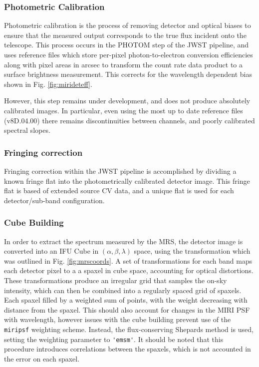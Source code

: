 \subsubsection{Photometric Calibration}
Photometric calibration is the process of removing detector and optical biases to ensure that the measured output corresponds to the true flux incident onto the telescope.
This process occurs in the PHOTOM step of the JWST pipeline, and uses reference files which store per-pixel photon-to-electron conversion efficiencies along with pixel areas in arcsec to transform the count rate data product to a surface brightness measurement.
This corrects for the wavelength dependent bias shown in Fig. \ref{fig:mirideteff}.

However, this step remains under development, and does not produce absolutely calibrated images. In particular, even using the most up to date reference files (v8D.04.00) there remains discontinuities between channels, and poorly calibrated spectral slopes.

\subsubsection{Fringing correction}
Fringing correction within the JWST pipeline is accomplished by dividing a known fringe flat into the photometrically calibrated detector image. 
This fringe flat is based of extended source CV data, and a unique flat is used for each detector/sub-band configuration.

\subsubsection{Cube Building}
In order to extract the spectrum measured by the MRS, the detector image is converted into an IFU Cube in $(\alpha,\beta,\lambda)$ space, using the transformation which was outlined in Fig. \ref{fig:mrscoords}.
A set of transformations for each band maps each detector pixel to a a spaxel in cube space, accounting for  optical distortions. 
These transformations produce an irregular grid that samples the on-sky intensity, which can then be combined into a regularly spaced grid of spaxels.
Each spaxel filled by a weighted sum of points, with the weight decreasing with distance from the spaxel. 
This should also account for changes in the MIRI PSF with wavelength, however issues with the cube building prevent use of the \verb|miripsf| weighting scheme.
Instead, the flux-conserving Shepards method is used, setting the weighting parameter to \verb|'emsm'|.
It should be noted that this procedure introduces correlations between the spaxels, which is not accounted in the error on each spaxel.

